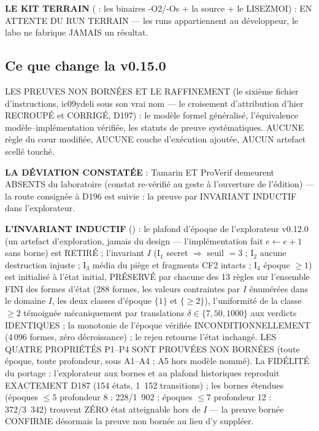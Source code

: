 \textbf{LE KIT TERRAIN} ( : les
binaires -O2/-Os + la source + le LISEZMOI) : EN ATTENTE DU RUN TERRAIN —
les runs appartiennent au développeur, le labo ne fabrique JAMAIS un
résultat.

\subsection{Ce que change la v0.15.0}\label{sec:nouveautes150}

LES PREUVES NON BORNÉES ET LE RAFFINEMENT (le sixième fichier
d'instructions, ic09ydeli sous son vrai nom — le croisement
d'attribution d'hier RECROUPÉ et CORRIGÉ, D197) : le modèle formel
généralisé, l'équivalence modèle--implémentation vérifiée, les statuts
de preuve systématiques. AUCUNE règle du cœur modifiée, AUCUNE couche
d'exécution ajoutée, AUCUN artefact scellé touché.

\textbf{LA DÉVIATION CONSTATÉE} : Tamarin ET ProVerif demeurent ABSENTS
du laboratoire (constat re-vérifié au geste à l'ouverture de l'édition)
— la route consignée à D196 est suivie : la preuve par INVARIANT
INDUCTIF dans l'explorateur.

\textbf{L'INVARIANT INDUCTIF} () : le plafond d'époque de l'explorateur
v0.12.0 (un artefact d'exploration, jamais du design — l'implémentation
fait $e \leftarrow e+1$ sans borne) est RETIRÉ ; l'invariant $I$
(I$_1$ secret $\Rightarrow$ seuil $=3$ ; I$_2$ aucune destruction
injuste ; I$_3$ média du piège et fragments CF2 intacts ; I$_4$ époque
$\ge 1$) est initialisé à l'état initial, PRÉSERVÉ par chacune des 13
règles sur l'ensemble FINI des formes d'état (288 formes, les valeurs
contraintes par $I$ énumérées dans le domaine $I$, les deux classes
d'époque $\{1\}$ et $\{\ge 2\}$), l'uniformité de la classe $\ge 2$
témoignée mécaniquement par translations $\delta \in \{7, 50, 1000\}$
aux verdicts IDENTIQUES ; la monotonie de l'époque vérifiée
INCONDITIONNELLEMENT (4\,096 formes, zéro décroissance) ; le rejeu
retourne l'état inchangé. LES QUATRE PROPRIÉTÉS P1--P4 SONT PROUVÉES
NON BORNÉES (toute époque, toute profondeur, sous A1--A4 ; A5 hors
modèle nommé). La FIDÉLITÉ du portage : l'explorateur aux bornes et au
plafond historiques reproduit EXACTEMENT D187 (154 états, 1~152
transitions) ; les bornes étendues (époques $\le 5$ profondeur 8 :
228/1~902 ; époques $\le 7$ profondeur 12 : 372/3~342) trouvent ZÉRO
état atteignable hors de $I$ — la preuve bornée CONFIRME désormais la
preuve non bornée au lieu d'y suppléer.

